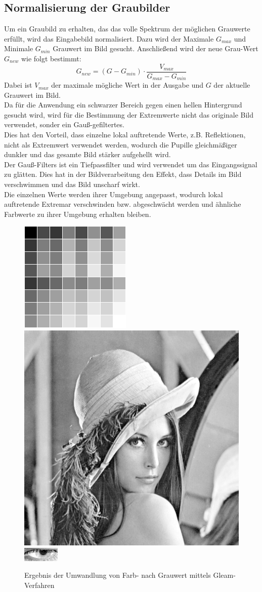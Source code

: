 \subsection{Normalisierung der Graubilder}
Um ein Graubild zu erhalten, das das volle Spektrum der möglichen Grauwerte erfüllt, wird das Eingabebild normalisiert. Dazu wird der Maximale $G_{max}$ und Minimale $G_{min}$ Grauwert im Bild gesucht. Anschließend wird der neue Grau-Wert $G_{new}$ wie folgt bestimmt:
\[G_{new} = (G-G_{min})\cdot \dfrac{V_{max}}{G_{max}-G_{min}}\]
Dabei ist $V_{max}$ der maximale mögliche Wert in der Ausgabe und $G$ der aktuelle Grauwert im Bild.\\
Da für die Anwendung ein schwarzer Bereich gegen einen hellen Hintergrund gesucht wird, wird für die Bestimmung der Extremwerte nicht das originale Bild verwendet, sonder ein Gauß-gefiltertes.\\
Dies hat den Vorteil, dass einzelne lokal auftretende Werte, z.B. Reflektionen, nicht als Extremwert verwendet werden, wodurch die Pupille gleichmäßiger dunkler und das gesamte Bild stärker aufgehellt wird.\\
Der Gauß-Filters ist ein Tiefpassfilter und wird verwendet um das Eingangssignal zu glätten. Dies hat in der Bildverarbeitung den Effekt, dass Details im Bild verschwimmen und das Bild unscharf wirkt.\\
Die einzelnen Werte werden ihrer Umgebung angepasst, wodurch lokal auftretende Extremar verschwinden bzw. abgeschwächt werden und ähnliche Farbwerte zu ihrer Umgebung erhalten bleiben.
\begin{figure}
	\centering
	\includegraphics[width=0.19\linewidth]{img/Farbkarte2}
	\includegraphics[width=0.19\linewidth]{img/Lena2}
	\includegraphics[width=0.19\linewidth]{img/Auge_2Gray}
	\caption{Ergebnis der Umwandlung von Farb- nach Grauwert mittels Gleam-Verfahren}
	\label{img_Gleam}
\end{figure}
